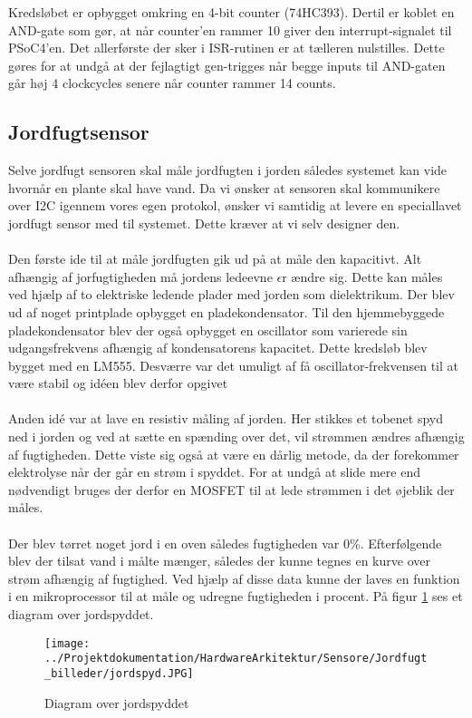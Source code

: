 Kredsløbet er opbygget omkring en 4-bit counter (74HC393). Dertil er koblet en AND-gate som gør, at når counter'en rammer 10 giver den interrupt-signalet til PSoC4'en. Det allerførste der sker i ISR-rutinen er at tælleren nulstilles. Dette gøres for at undgå at der fejlagtigt gen-trigges når begge inputs til AND-gaten går høj 4 clockcycles senere når counter rammer 14 counts. 

\subsection{Jordfugtsensor}
Selve jordfugt sensoren skal måle jordfugten i jorden således systemet kan vide hvornår en plante skal have vand. 
Da vi ønsker at sensoren skal kommunikere over I2C igennem vores egen protokol, ønsker vi samtidig at levere en speciallavet jordfugt sensor med til systemet. Dette kræver at vi selv designer den. 
\\\\
Den første ide til at måle jordfugten gik ud på at måle den kapacitivt.  
Alt afhængig af jorfugtigheden må jordens ledeevne $\epsilon$r ændre sig. Dette kan måles ved hjælp af to elektriske ledende plader med jorden som dielektrikum. Der blev ud af noget printplade opbygget en pladekondensator. Til den hjemmebyggede pladekondensator blev der også opbygget en oscillator som varierede sin udgangsfrekvens afhængig af kondensatorens kapacitet. Dette kredsløb blev bygget med en LM555. Desværre var det umuligt af få oscillator-frekvensen til at være stabil og idéen blev derfor opgivet
\\\\
Anden idé var at lave en resistiv måling af jorden. Her stikkes et tobenet spyd ned i jorden og ved at sætte en spænding over det, vil strømmen ændres afhængig af fugtigheden. Dette viste sig også at være en dårlig metode, da der forekommer elektrolyse når der går en strøm i spyddet. For at undgå at slide mere end nødvendigt bruges der derfor en MOSFET til at lede strømmen i det øjeblik der måles.  
\\\\
Der blev tørret noget jord i en oven således fugtigheden var 0\%. Efterfølgende blev der tilsat vand i målte mænger, således der kunne tegnes en kurve over strøm afhængig af fugtighed. Ved hjælp af disse data kunne der laves en funktion i en mikroprocessor til at måle og udregne fugtigheden i procent. På figur \ref{photo:jordspyd_diagram} ses et diagram over jordspyddet. 

\begin{figure}[H]
	\centering 
	\texttt{[image: ../Projektdokumentation/HardwareArkitektur/Sensore/Jordfugt\_billeder/jordspyd.JPG]}
	\caption{Diagram over jordspyddet}
	\label{photo:jordspyd_diagram}
\end{figure} 

